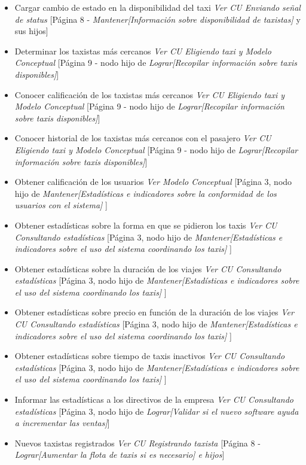 \documentclass[a4paper]{article}
\begin{document}
\begin{itemize}
\item Cargar cambio de estado en la disponibilidad del taxi \textit{Ver CU Enviando se\~nal de status} [P\'agina 8 - \textit{Mantener[Informaci\'on sobre disponibilidad de taxistas]} y sus hijos]
\item Determinar los taxistas m\'as cercanos \textit{Ver CU Eligiendo taxi y Modelo Conceptual} [P\'agina 9 - nodo hijo de \textit{Lograr[Recopilar informaci\'on sobre taxis disponibles]}]
\item Conocer calificaci\'on de los taxistas m\'as cercanos \textit{Ver CU Eligiendo taxi y Modelo Conceptual} [P\'agina 9 - nodo hijo de \textit{Lograr[Recopilar informaci\'on sobre taxis disponibles]}]
\item Conocer historial de los taxistas m\'as cercanos con el pasajero \textit{Ver CU Eligiendo taxi y Modelo Conceptual} [P\'agina 9 - nodo hijo de \textit{Lograr[Recopilar informaci\'on sobre taxis disponibles]}]
\item Obtener calificaci\'on de los usuarios \textit{Ver Modelo Conceptual} [P\'agina 3, nodo hijo de \textit{Mantener[Estad\'isticas e indicadores sobre la conformidad de los usuarios con el sistema]} ]
\item Obtener estad\'isticas sobre la forma en que se pidieron los taxis \textit{Ver CU Consultando estad\'isticas} [P\'agina 3, nodo hijo de \textit{Mantener[Estad\'isticas e indicadores sobre el uso del sistema coordinando los taxis]} ]
\item Obtener estad\'isticas sobre la duraci\'on de los viajes \textit{Ver CU Consultando estad\'isticas} [P\'agina 3, nodo hijo de \textit{Mantener[Estad\'isticas e indicadores sobre el uso del sistema coordinando los taxis]} ]
\item Obtener estad\'isticas sobre precio en funci\'on de la duraci\'on de los viajes \textit{Ver CU Consultando estad\'isticas} [P\'agina 3, nodo hijo de \textit{Mantener[Estad\'isticas e indicadores sobre el uso del sistema coordinando los taxis]} ]
\item Obtener estad\'isticas sobre tiempo de taxis inactivos \textit{Ver CU Consultando estad\'isticas} [P\'agina 3, nodo hijo de \textit{Mantener[Estad\'isticas e indicadores sobre el uso del sistema coordinando los taxis]} ]
\item Informar las estad\'isticas a los directivos de la empresa \textit{Ver CU Consultando estad\'isticas} [P\'agina 3, nodo hijo de \textit{Lograr[Validar si el nuevo software ayuda a incrementar las ventas]}]
\item Nuevos taxistas registrados \textit{Ver CU Registrando taxista} [P\'agina 8 - \textit{Lograr[Aumentar la flota de taxis si es necesario] e hijos}]

\end{itemize}
\end{document}
